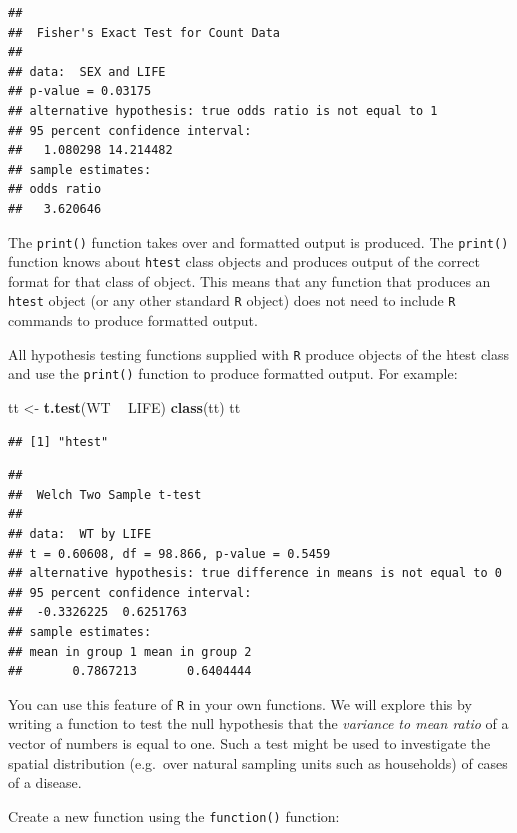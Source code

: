 \documentclass[12pt,a4paper]{book}
\newenvironment{Shaded}{\begin{snugshade}}{\end{snugshade}}
\newcommand{\KeywordTok}[1]{\textcolor[rgb]{0.13,0.29,0.53}{\textbf{#1}}}
\newcommand{\NormalTok}[1]{#1}
\newcommand{\OperatorTok}[1]{\textcolor[rgb]{0.81,0.36,0.00}{\textbf{#1}}}
\newcommand{\StringTok}[1]{\textcolor[rgb]{0.31,0.60,0.02}{#1}}
\theoremstyle{definition}
\theoremstyle{definition}
\theoremstyle{definition}
\theoremstyle{remark}
\begin{document}
\begin{verbatim}
## 
##  Fisher's Exact Test for Count Data
## 
## data:  SEX and LIFE
## p-value = 0.03175
## alternative hypothesis: true odds ratio is not equal to 1
## 95 percent confidence interval:
##   1.080298 14.214482
## sample estimates:
## odds ratio 
##   3.620646
\end{verbatim}

The \texttt{print()} function takes over and formatted output is
produced. The \texttt{print()} function knows about \texttt{htest} class
objects and produces output of the correct format for that class of
object. This means that any function that produces an \texttt{htest}
object (or any other standard \texttt{R} object) does not need to
include \texttt{R} commands to produce formatted output.

All hypothesis testing functions supplied with \texttt{R} produce
objects of the htest class and use the \texttt{print()} function to
produce formatted output. For example:

\begin{Shaded}
\begin{Highlighting}[]
\NormalTok{tt <-}\StringTok{ }\KeywordTok{t.test}\NormalTok{(WT }\OperatorTok{~}\StringTok{ }\NormalTok{LIFE)}
\KeywordTok{class}\NormalTok{(tt)}
\NormalTok{tt}
\end{Highlighting}
\end{Shaded}

\begin{verbatim}
## [1] "htest"
\end{verbatim}

\begin{verbatim}
## 
##  Welch Two Sample t-test
## 
## data:  WT by LIFE
## t = 0.60608, df = 98.866, p-value = 0.5459
## alternative hypothesis: true difference in means is not equal to 0
## 95 percent confidence interval:
##  -0.3326225  0.6251763
## sample estimates:
## mean in group 1 mean in group 2 
##       0.7867213       0.6404444
\end{verbatim}

You can use this feature of \texttt{R} in your own functions. We will
explore this by writing a function to test the null hypothesis that the
\emph{variance to mean ratio} of a vector of numbers is equal to one.
Such a test might be used to investigate the spatial distribution
(e.g.~over natural sampling units such as households) of cases of a
disease.

Create a new function using the \texttt{function()} function:
\end{document}

